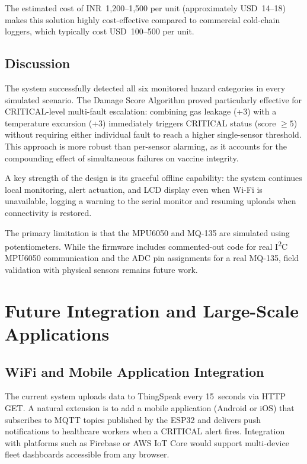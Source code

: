 \documentclass[12pt, a4paper]{article}
\begin{document}
\noindent The estimated cost of INR~1,200--1,500 per unit (approximately USD~14--18) makes this solution highly cost-effective compared to commercial cold-chain loggers, which typically cost USD~100--500 per unit.

\subsection{Discussion}

The system successfully detected all six monitored hazard categories in every simulated scenario. The Damage Score Algorithm proved particularly effective for CRITICAL-level multi-fault escalation: combining gas leakage (+3) with a temperature excursion (+3) immediately triggers CRITICAL status (score $\geq 5$) without requiring either individual fault to reach a higher single-sensor threshold. This approach is more robust than per-sensor alarming, as it accounts for the compounding effect of simultaneous failures on vaccine integrity.

A key strength of the design is its graceful offline capability: the system continues local monitoring, alert actuation, and LCD display even when Wi-Fi is unavailable, logging a warning to the serial monitor and resuming uploads when connectivity is restored.

The primary limitation is that the MPU6050 and MQ-135 are simulated using potentiometers. While the firmware includes commented-out code for real I\textsuperscript{2}C MPU6050 communication and the ADC pin assignments for a real MQ-135, field validation with physical sensors remains future work.

\section{Future Integration and Large-Scale Applications}
\label{sec:future}

\subsection{WiFi and Mobile Application Integration}

The current system uploads data to ThingSpeak every 15~seconds via HTTP GET. A natural extension is to add a mobile application (Android or iOS) that subscribes to MQTT topics published by the ESP32 and delivers push notifications to healthcare workers when a CRITICAL alert fires. Integration with platforms such as Firebase or AWS IoT Core would support multi-device fleet dashboards accessible from any browser.
\end{document}
